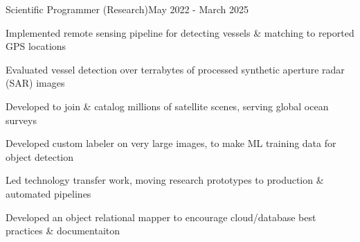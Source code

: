 \documentclass{article}
\newenvironment{**mylist}[2]{

\subsubsection*{#1\hfill#2}
  \small
  \begin{list}{}{}
    \setlength{\topsep}{0pt}
   \setlength{\itemsep}{1pt}
   \setlength{\parskip}{0pt}
   \setlength{\parsep}{0pt}}{\end{list}\normalsize}
\begin{document}
\begin{**mylist}{\href{https://globalfishingwatch.org/}{} \tabb Scientific Programmer (Research)}{May 2022 - March 2025}
\item Implemented remote sensing pipeline for detecting vessels \& matching to reported GPS locations
\item Evaluated vessel detection over terrabytes of processed synthetic aperture radar (SAR) images 
\item Developed  to join \& catalog millions of satellite scenes, serving global ocean surveys
\item Developed custom labeler on very large images, to make ML training data for object detection
\item Led technology transfer work, moving research prototypes to production \& automated pipelines
\item Developed an object relational mapper to encourage cloud/database best practices \& documentaiton
\end{**mylist}
\end{document}
